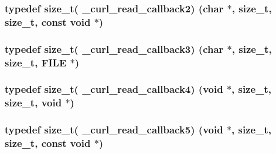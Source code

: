 \subsubsection[{\texorpdfstring{\+\_\+curl\+\_\+read\+\_\+callback2}{_curl_read_callback2}}]{\setlength{\rightskip}{0pt plus 5cm}typedef size\+\_\+t( \+\_\+curl\+\_\+read\+\_\+callback2) (char $\ast$, size\+\_\+t, size\+\_\+t, const void $\ast$)}\hypertarget{typecheck-gcc_8h_abc8917aae6499414b1ed0d570d8a9b72}{}\label{typecheck-gcc_8h_abc8917aae6499414b1ed0d570d8a9b72}
\subsubsection[{\texorpdfstring{\+\_\+curl\+\_\+read\+\_\+callback3}{_curl_read_callback3}}]{\setlength{\rightskip}{0pt plus 5cm}typedef size\+\_\+t( \+\_\+curl\+\_\+read\+\_\+callback3) (char $\ast$, size\+\_\+t, size\+\_\+t, F\+I\+LE $\ast$)}\hypertarget{typecheck-gcc_8h_a9202adcd389876f4145aec8acd84387e}{}\label{typecheck-gcc_8h_a9202adcd389876f4145aec8acd84387e}
\subsubsection[{\texorpdfstring{\+\_\+curl\+\_\+read\+\_\+callback4}{_curl_read_callback4}}]{\setlength{\rightskip}{0pt plus 5cm}typedef size\+\_\+t( \+\_\+curl\+\_\+read\+\_\+callback4) (void $\ast$, size\+\_\+t, size\+\_\+t, void $\ast$)}\hypertarget{typecheck-gcc_8h_acb4f6e1103153bc123153dc508530645}{}\label{typecheck-gcc_8h_acb4f6e1103153bc123153dc508530645}
\subsubsection[{\texorpdfstring{\+\_\+curl\+\_\+read\+\_\+callback5}{_curl_read_callback5}}]{\setlength{\rightskip}{0pt plus 5cm}typedef size\+\_\+t( \+\_\+curl\+\_\+read\+\_\+callback5) (void $\ast$, size\+\_\+t, size\+\_\+t, const void $\ast$)}\hypertarget{typecheck-gcc_8h_acb2e70bfa62e3fad2801c74ad83ae43c}{}\label{typecheck-gcc_8h_acb2e70bfa62e3fad2801c74ad83ae43c}
